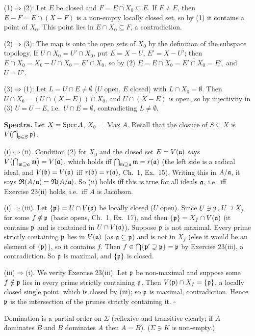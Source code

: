 \documentclass[11pt]{article}
\begin{document}
(1)$\Rightarrow$(2): Let $E$ be closed and $F=\overline{E\cap X_0}\subseteq E$. If $F\ne E$, then $E-F=E\cap(X-F)$ is a non-empty locally closed set, so by (1) it contains a point of $X_0$. This point lies in $E\cap X_0\subseteq F$, a contradiction.

(2)$\Rightarrow$(3): The map is onto the open sets of $X_0$ by the definition of the subspace topology. If $U\cap X_0=U'\cap X_0$, put $E=X-U$, $E'=X-U'$; then $E\cap X_0=X_0-U\cap X_0=E'\cap X_0$, so by (2) $E=\overline{E\cap X_0}=\overline{E'\cap X_0}=E'$, and $U=U'$.

(3)$\Rightarrow$(1): Let $L=U\cap E\ne\emptyset$ ($U$ open, $E$ closed) with $L\cap X_0=\emptyset$. Then $U\cap X_0=(U\cap(X-E))\cap X_0$, and $U\cap(X-E)$ is open, so by injectivity in (3) $U=U-E$, i.e.\ $U\cap E=\emptyset$, contradicting $L\ne\emptyset$.

\textbf{Spectra.} Let $X=\operatorname{Spec} A$, $X_0=\operatorname{Max}A$. Recall that the closure of $S\subseteq X$ is $V(\bigcap_{\mathfrak p\in S}\mathfrak p)$.

(i)$\Leftrightarrow$(ii). Condition (2) for $X_0$ and the closed set $E=V(\mathfrak a)$ says $V\bigl(\bigcap_{\mathfrak m\supseteq\mathfrak a}\mathfrak m\bigr)=V(\mathfrak a)$, which holds iff $\bigcap_{\mathfrak m\supseteq\mathfrak a}\mathfrak m=r(\mathfrak a)$ (the left side is a radical ideal, and $V(\mathfrak b)=V(\mathfrak a)$ iff $r(\mathfrak b)=r(\mathfrak a)$, Ch.~1, Ex.~15). Writing this in $A/\mathfrak a$, it says $\mathfrak R(A/\mathfrak a)=\mathfrak N(A/\mathfrak a)$. So (ii) holds iff this is true for all ideals $\mathfrak a$, i.e.\ iff Exercise 23(ii) holds, i.e.\ iff $A$ is Jacobson.

(i)$\Rightarrow$(iii). Let $\{\mathfrak p\}=U\cap V(\mathfrak a)$ be locally closed ($U$ open). Since $U\ni\mathfrak p$, $U\supseteq X_f$ for some $f\notin\mathfrak p$ (basic opens, Ch.~1, Ex.~17), and then $\{\mathfrak p\}=X_f\cap V(\mathfrak a)$ (it contains $\mathfrak p$ and is contained in $U\cap V(\mathfrak a)$). Suppose $\mathfrak p$ is not maximal. Every prime strictly containing $\mathfrak p$ lies in $V(\mathfrak a)$ (as $\mathfrak a\subseteq\mathfrak p$) and is not in $X_f$ (else it would be an element of $\{\mathfrak p\}$), so it contains $f$. Then $f\in\bigcap\{\mathfrak p'\supsetneq\mathfrak p\}=\mathfrak p$ by Exercise 23(iii), a contradiction. So $\mathfrak p$ is maximal, and $\{\mathfrak p\}$ is closed.

(iii)$\Rightarrow$(i). We verify Exercise 23(iii). Let $\mathfrak p$ be non-maximal and suppose some $f\notin\mathfrak p$ lies in every prime strictly containing $\mathfrak p$. Then $V(\mathfrak p)\cap X_f=\{\mathfrak p\}$, a locally closed single point, which is closed by (iii); so $\mathfrak p$ is maximal, contradiction. Hence $\mathfrak p$ is the intersection of the primes strictly containing it. \hfill$\square$

\pf
Domination is a partial order on $\Sigma$ (reflexive and transitive clearly; if $A$ dominates $B$ and $B$ dominates $A$ then $A=B$). ($\Sigma\ni K$ is non-empty.)
\end{document}
